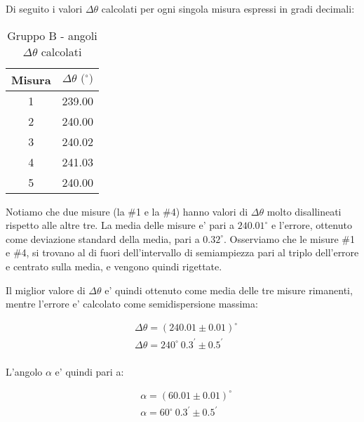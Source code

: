 Di seguito i valori $\Delta \theta$ calcolati per ogni singola misura espressi in gradi decimali:
\begin{table}[!htbp]
    {\par\centering
    \begin{tabular}{cc}
        \hline
        Misura & $\Delta \theta \text{ ($^{\circ}$)}$ \\
        \hline
        1   &   239.00 \\
        2   &   240.00 \\
        3   &   240.02 \\
        4   &   241.03 \\
        5   &   240.00 \\
        \hline
    \end{tabular}
    \par}
    \caption{Gruppo B - angoli $\Delta \theta$ calcolati}
\end{table}

Notiamo che due misure (la \#1 e la \#4) hanno valori di $\Delta \theta$ molto disallineati rispetto alle altre tre.
La media delle misure e' pari a $240.01^{\circ}$ e l'errore, ottenuto come deviazione standard della media, pari a $0.32^{\circ}$.
Osserviamo che le misure \#1 e \#4, si trovano al di fuori dell'intervallo di semiampiezza pari al triplo dell'errore e centrato sulla media, e vengono quindi rigettate.

Il miglior valore di $\Delta \theta$ e' quindi ottenuto come media delle tre misure rimanenti, mentre l'errore e' calcolato come semidispersione massima:

    \begin{align*}
        &\Delta \theta = (240.01 \pm 0.01)^{\circ} \\
        &\Delta \theta = 240^{\circ}\ 0.3^{\prime} \pm 0.5^{\prime} \\
    \end{align*}


L'angolo $\alpha$ e' quindi pari a:

    \begin{align*}
        &\alpha = (60.01 \pm 0.01)^{\circ} \\
        &\alpha = 60^{\circ} \ 0.3^{\prime} \pm 0.5^{\prime}
    \end{align*}


